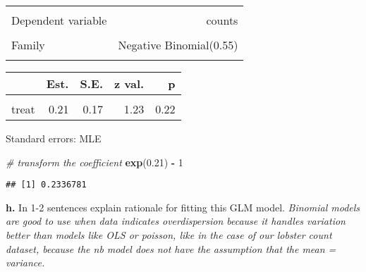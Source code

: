 \documentclass[
]{article}
\newenvironment{Shaded}{\begin{snugshade}}{\end{snugshade}}
\newcommand{\CommentTok}[1]{\textcolor[rgb]{0.56,0.35,0.01}{\textit{#1}}}
\newcommand{\DecValTok}[1]{\textcolor[rgb]{0.00,0.00,0.81}{#1}}
\newcommand{\FloatTok}[1]{\textcolor[rgb]{0.00,0.00,0.81}{#1}}
\newcommand{\FunctionTok}[1]{\textcolor[rgb]{0.13,0.29,0.53}{\textbf{#1}}}
\newcommand{\NormalTok}[1]{#1}
\newcommand{\SpecialCharTok}[1]{\textcolor[rgb]{0.81,0.36,0.00}{\textbf{#1}}}
\begin{document}
\begin{table}[!h]
\centering
\begin{tabular}{lr}
\toprule
\cellcolor{gray!10}{Observations} & \cellcolor{gray!10}{252}\\
Dependent variable & counts\\
\cellcolor{gray!10}{Type} & \cellcolor{gray!10}{Generalized linear model}\\
Family & Negative Binomial(0.55)\\
\cellcolor{gray!10}{Link} & \cellcolor{gray!10}{log}\\
\bottomrule
\end{tabular}
\end{table}  \begin{table}[!h]
\centering
\begin{threeparttable}
\begin{tabular}{lrrrr}
\toprule
  & Est. & S.E. & z val. & p\\
\midrule
\cellcolor{gray!10}{(Intercept)} & \cellcolor{gray!10}{3.12} & \cellcolor{gray!10}{0.12} & \cellcolor{gray!10}{26.40} & \cellcolor{gray!10}{0.00}\\
treat & 0.21 & 0.17 & 1.23 & 0.22\\
\bottomrule
\end{tabular}
\begin{tablenotes}
\item Standard errors: MLE
\end{tablenotes}
\end{threeparttable}
\end{table}

\begin{Shaded}
\begin{Highlighting}[]
\CommentTok{\# transform the coefficient}
\FunctionTok{exp}\NormalTok{(}\FloatTok{0.21}\NormalTok{) }\SpecialCharTok{{-}} \DecValTok{1}
\end{Highlighting}
\end{Shaded}

\begin{verbatim}
## [1] 0.2336781
\end{verbatim}

\textbf{h.} In 1-2 sentences explain rationale for fitting this GLM
model. \emph{Binomial models are good to use when data indicates
overdispersion because it handles variation better than models like OLS
or poisson, like in the case of our lobster count dataset, because the
nb model does not have the assumption that the mean = variance.}
\end{document}

